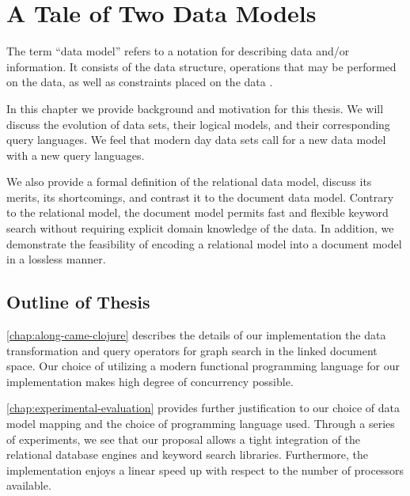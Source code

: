\chapter{A Tale of Two Data Models}
\label{chap:tale-of-two-data-models}
	The term ``data model'' refers to a notation for describing data and/or information.  It consists of the data structure, operations that may be performed on the data, as well as constraints placed on the data \cite{dbsys-06}.
	
	In this chapter we provide background and motivation for this thesis.  We will discuss the evolution of data sets, their logical models, and their corresponding query languages.  We feel that modern day data sets call for a new data model with a new query languages.
	
	We also provide a formal definition of the relational data model, discuss its merits, its shortcomings, and contrast it to the document data model.  Contrary to the relational model, the document model permits fast and flexible keyword search without requiring explicit domain knowledge of the data.  In addition, we demonstrate the feasibility of encoding a relational model into a document model in a lossless manner.
	
	
	
	
	\section{Outline of Thesis}
		\cref{chap:along-came-clojure} describes the details of our implementation the data transformation and query operators for graph search in the linked document space.  Our choice of utilizing a modern functional programming language for our implementation makes high degree of concurrency possible.
		
		\cref{chap:experimental-evaluation} provides further justification to our choice of data model mapping and the choice of programming language used.  Through a series of experiments, we see that our proposal allows a tight integration of the relational database engines and keyword search libraries.  Furthermore, the implementation enjoys a linear speed up with respect to the number of processors available.